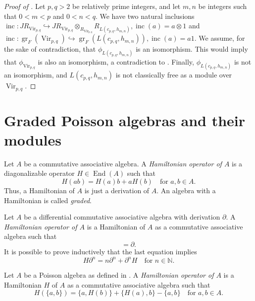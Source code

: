 \documentclass[a4paper, 12pt, reqno]{amsart}
\theoremstyle{remark}
\DeclareMathOperator{\Vir}{Vir}
\DeclareMathOperator{\gr}{gr}
\DeclareMathOperator{\End}{End}
\DeclareMathOperator{\inc}{inc}
\begin{document}
\begin{proof}[Proof of ]
  Let $p, q > 2$ be relatively prime integers, and let $m, n$ be integers such that $0 < m < p$ and $0 < n < q$.
  We have two natural inclusions $\inc: JR_{\Vir_{p, q}} \hookrightarrow JR_{\Vir_{p, q}} \otimes_{R_{\Vir_{p, q}}} R_{L(c_{p, q}, h_{m, n})}, \inc(a) = a \otimes 1$ and $\inc: \gr_F(\Vir_{p, q}) \hookrightarrow \gr_F(L(c_{p, q}, h_{m, n})), \inc(a) = a1$.
  We assume, for the sake of contradiction, that $\phi_{L(c_{p, q}, h_{m, n})}$ is an isomorphism.
  This would imply that $\phi_{\Vir_{p, q}}$ is also an isomorphism, a contradiction to .
  Finally, $\phi_{L(c_{p, q}, h_{m, n})}$ is not an isomorphism, and $L(c_{p, q}, h_{m, n})$ is not classically free as a module over $\Vir_{p, q}$.
\end{proof}

\appendix
\section{Graded Poisson algebras and their modules}
\label{sec:grad-poiss-algeb}

Let $A$ be a commutative associative algebra.
A \emph{Hamiltonian operator of $A$} is a diagonalizable operator $H \in \End(A)$ such that
\begin{equation*}
  H(ab) = H(a)b + aH(b) \quad \text{for $a, b \in A$}.
\end{equation*}
Thus, a Hamiltonian of $A$ is just a derivation of $A$.
An algebra with a Hamiltonian is called \emph{graded}.

Let $A$ be a differential commutative associative algebra with derivation $\partial$.
A \emph{Hamiltonian operator of $A$} is a Hamiltonian of $A$ as a commutative associative algebra such that
\begin{equation*}
  [H, \partial] = \partial.
\end{equation*}
It is possible to prove inductively that the last equation implies
\begin{equation}
  \label{eq:14}
  H\partial^n = n\partial^n + \partial^nH \quad \text{for $n \in \mathbb{N}$}.
\end{equation}

Let $A$ be a Poisson algebra as defined in \cite{caressa_examples_2003}.
A \emph{Hamiltonian operator of $A$} is a Hamiltonian $H$ of $A$ as a commutative associative algebra such that
\begin{equation*}
  H(\{a, b\}) = \{a, H(b)\} + \{H(a), b\} - \{a, b\} \quad \text{for $a, b \in A$}.
\end{equation*}
\end{document}
